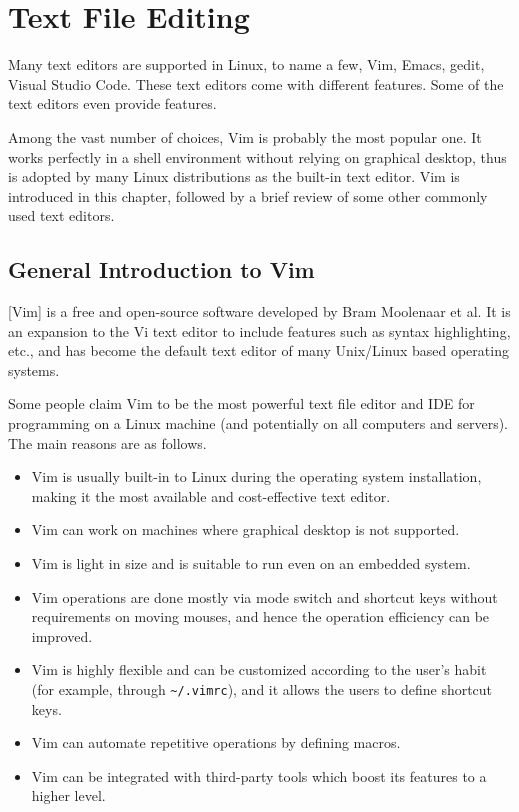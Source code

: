 \chapter{Text File Editing} \label{ch:tfe}

Many text editors are supported in Linux, to name a few, Vim, Emacs, gedit, Visual Studio Code. These text editors come with different features. Some of the text editors even provide  features.

Among the vast number of choices, Vim is probably the most popular one. It works perfectly in a shell environment without relying on graphical desktop, thus is adopted by many Linux distributions as the built-in text editor. Vim is introduced in this chapter, followed by a brief review of some other commonly used text editors.

\section{General Introduction to Vim}

[Vim] is a free and open-source software developed by Bram Moolenaar et al. It is an expansion to the Vi text editor to include features such as syntax highlighting, etc., and has become the default text editor of many Unix/Linux based operating systems.

Some people claim Vim to be the most powerful text file editor and IDE for programming on a Linux machine (and potentially on all computers and servers). The main reasons are as follows.
\begin{itemize}
  \item Vim is usually built-in to Linux during the operating system installation, making it the most available and cost-effective text editor.
  \item Vim can work on machines where graphical desktop is not supported.
  \item Vim is light in size and is suitable to run even on an embedded system.
  \item Vim operations are done mostly via mode switch and shortcut keys without requirements on moving mouses, and hence the operation efficiency can be improved.
  \item Vim is highly flexible and can be customized according to the user's habit (for example, through \verb|~/.vimrc|), and it allows the users to define shortcut keys.
  \item Vim can automate repetitive operations by defining macros.
  \item Vim can be integrated with third-party tools which boost its features to a higher level.
\end{itemize}

